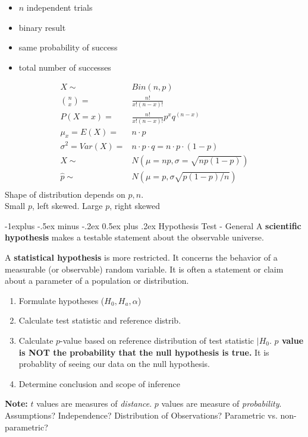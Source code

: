 \documentclass[10pt,landscape]{article}
\makeatletter
\renewcommand{\subsection}{\@startsection{subsection}{2}{0mm}%
                                {-1explus -.5ex minus -.2ex}%
                                {0.5ex plus .2ex}%
                                {\normalfont\normalsize\bfseries}}
\makeatother
\begin{document}
\begin{multicols*}{3}
\begin{itemize}
\item{$n$ independent trials}
\item{binary result}
\item{same probability of success}
\item{total number of successes}
\end{itemize}
\begin{align*}
X \sim& Bin(n,p)\\
\binom{n}{x} =& \frac{n!}{x!(n-x)!}\\
P(X=x) =& \frac{n!}{x!(n-x)!}p^xq^{(n-x)}\\
\mu_x = E(X) =& n \cdot p\\
\sigma^2 = Var(X) =& n \cdot p \cdot q = n \cdot p \cdot (1-p)\\
X \sim& N(\mu =np, \sigma = \sqrt{np(1-p)}) \\
\hat{p} \sim& N(\mu = p, \sigma\sqrt{p(1-p)/n} ) \\
\end{align*}
Shape of distribution depends on $p,n$.\\
Small $p$, left skewed. Large $p$, right skewed




\subsection{Hypothesis Test - General}
A \textbf{scientific hypothesis} makes a testable statement about the observable universe.

A \textbf{statistical hypothesis} is more restricted. It concerns the behavior of a measurable (or observable) 
random variable. It is often a statement or claim about a parameter of a population or distribution.

\begin{enumerate}
\item Formulate hypotheses ($H_0, H_a, \alpha$)
\item Calculate test statistic and reference distrib.
\item Calculate $p$-value based on reference distribution of test statistic $|H_0$. \textbf{$p$ value is NOT the probability that the null hypothesis is true.} 
It is probablity of seeing our data on the null hypothesis. 
\item Determine conclusion and scope of inference
\end{enumerate}
\textbf{Note:} $t$ values are measures of \textit{distance}. $p$ values are measure of \textit{probability}. Assumptions? Independence? Distribution of Observations? Parametric vs. non-parametric?


\end{multicols*}
\end{document}
